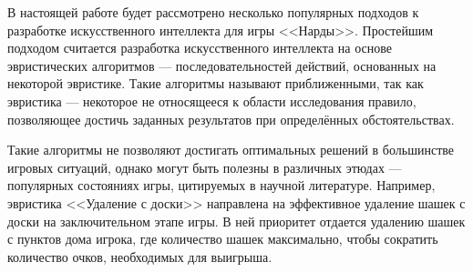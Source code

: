 В настоящей работе будет рассмотрено несколько популярных подходов к разработке искусственного интеллекта для игры <<Нарды>>. Простейшим подходом считается разработка искусственного интеллекта на основе эвристических алгоритмов --- последовательностей действий, основанных на некоторой эвристике. Такие алгоритмы называют приближенными, так как эвристика --- некоторое не относящееся к области исследования правило, позволяющее достичь заданных результатов при определённых обстоятельствах.

Такие алгоритмы не позволяют достигать оптимальных решений в большинстве игровых ситуаций, однако могут быть полезны в различных этюдах --- популярных состояниях игры, цитируемых в научной литературе. Например, эвристика <<Удаление с доски>> направлена на эффективное удаление шашек с доски на заключительном этапе игры. В ней приоритет отдается удалению шашек с пунктов дома игрока, где количество шашек максимально, чтобы сократить количество очков, необходимых для выигрыша.
